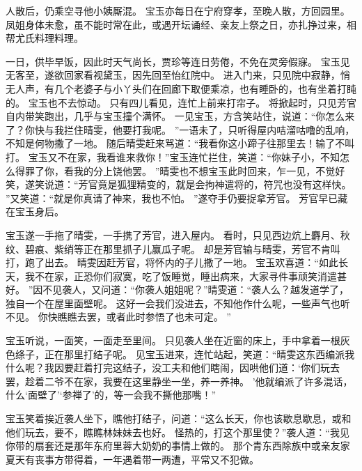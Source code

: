 人散后，仍乘空寻他小姨厮混。
宝玉亦每日在宁府穿孝，至晚人散，方回园里。
凤姐身体未愈，虽不能时常在此，或遇开坛诵经、亲友上祭之日，亦扎挣过来，相帮尤氏料理料理。
\par
一日，供毕早饭，因此时天气尚长，贾珍等连日劳倦，不免在灵旁假寐。
宝玉见无客至，遂欲回家看视黛玉，因先回至怡红院中。
进入门来，只见院中寂静，悄无人声，有几个老婆子与小丫头们在回廊下取便乘凉，也有睡卧的，也有坐着打盹的。
宝玉也不去惊动。
只有四儿看见，连忙上前来打帘子。
将掀起时，只见芳官自内带笑跑出，几乎与宝玉撞个满怀。
一见宝玉，方含笑站住，说道：“你怎么来了？你快与我拦住晴雯，他要打我呢。
”一语未了，只听得屋内咭溜咕噜的乱响，不知是何物撒了一地。
随后晴雯赶来骂道：“我看你这小蹄子往那里去！输了不叫打。
宝玉又不在家，我看谁来救你！”宝玉连忙拦住，笑道：“你妹子小，不知怎么得罪了你，看我的分上饶他罢。
”晴雯也不想宝玉此时回来，乍一见，不觉好笑，遂笑说道：“芳官竟是狐狸精变的，就是会拘神遣将的，符咒也没有这样快。
”又笑道：“就是你真请了神来，我也不怕。
”遂夺手仍要捉拿芳官。
芳官早已藏在宝玉身后。
\par
宝玉遂一手拖了晴雯，一手携了芳官，进入屋内。
看时，只见西边炕上麝月、秋纹、碧痕、紫绡等正在那里抓子儿赢瓜子呢。
却是芳官输与晴雯，芳官不肯叫打，跑了出去。
晴雯因赶芳官，将怀内的子儿撒了一地。
宝玉欢喜道：“如此长天，我不在家，正恐你们寂寞，吃了饭睡觉，睡出病来，大家寻件事顽笑消遣甚好。
”因不见袭人，又问道：“你袭人姐姐呢？”晴雯道：“袭人么？越发道学了，独自一个在屋里面壁呢。
这好一会我们没进去，不知他作什么呢，一些声气也听不见。
你快瞧瞧去罢，或者此时参悟了也未可定。
”\par
宝玉听说，一面笑，一面走至里间。
只见袭人坐在近窗的床上，手中拿着一根灰色绦子，正在那里打结子呢。
见宝玉进来，连忙站起，笑道：“晴雯这东西编派我什么呢？我因要赶着打完这结子，没工夫和他们瞎闹，因哄他们道：‘你们玩去罢，趁着二爷不在家，我要在这里静坐一坐，养一养神。
’他就编派了许多混话，什么‘面壁了’‘参禅了’的，等一会我不撕他那嘴！”\par
宝玉笑着挨近袭人坐下，瞧他打结子，问道：“这么长天，你也该歇息歇息，或和他们玩去，要不，瞧瞧林妹妹去也好。
怪热的，打这个那里使？”袭人道：“我见你带的扇套还是那年东府里蓉大奶奶的事情上做的。
那个青东西除族中或亲友家夏天有丧事方带得着，一年遇着带一两遭，平常又不犯做。
